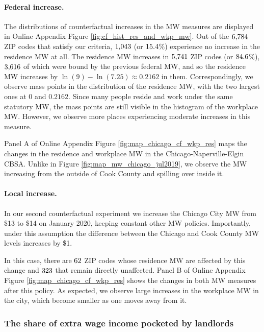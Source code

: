 \paragraph{Federal increase.}

The distributions of counterfactual increases in the MW measures are displayed 
in Online Appendix Figure \ref{fig:cf_hist_res_and_wkp_mw}.
Out of the $\textnormal{6,784}$ ZIP codes that satisfy our criteria, 
$\textnormal{1,043}$ (or $\textnormal{15.4}$\%) experience no increase in 
the residence MW at all.
The residence MW increases in $\textnormal{5,741}$ ZIP codes  (or $\textnormal{84.6}$\%), 
$\textnormal{3,616}$ of which were bound by the previous federal MW, and 
so the residence MW increases by $\ln(9)-\ln(7.25)\approx 0.2162$ in them.
Correspondingly, we observe mass points in the distribution of the residence MW,
with the two largest ones at $0$ and $0.2162$.
Since many people reside and work under the same statutory MW, the mass points 
are still visible in the histogram of the workplace MW.
However, we observe more places experiencing moderate increases in this measure.

Panel A of Online Appendix Figure \ref{fig:map_chicago_cf_wkp_res} maps the 
changes in the residence and workplace MW in the Chicago-Naperville-Elgin CBSA.
Unlike in Figure \ref{fig:map_mw_chicago_jul2019}, we observe the MW increasing 
from the outside of Cook County and spilling over inside it.

\paragraph{Local increase.}

In our second counterfactual experiment we increase the Chicago City MW 
from \$13 to \$14 on January 2020, keeping constant other MW policies.
Importantly, under this assumption the difference between the Chicago
and Cook County MW levels increases by \$1.

In this case, there are $\textnormal{62}$ ZIP codes whose 
residence MW are affected by this change and $\textnormal{323}$ 
that remain directly unaffected.
Panel B of Online Appendix Figure \ref{fig:map_chicago_cf_wkp_res} shows the 
changes in both MW measures after this policy.
As expected, we observe large increases in the workplace MW in the city, 
which become smaller as one moves away from it.

\subsubsection{The share of extra wage income pocketed by landlords}
\label{sec:cf_rents_and_wage_changes}

